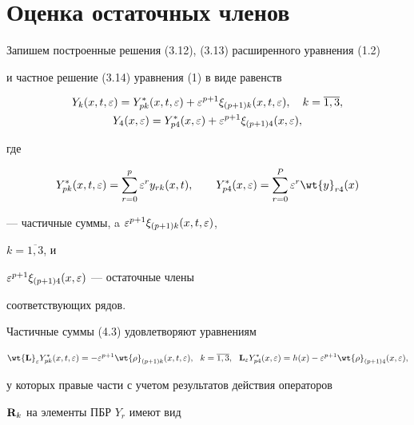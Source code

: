 \section{Оценка остаточных членов}





Запишем построенные решения (3.12), (3.13) расширенного уравнения (1.2)


и частное решение (3.14) уравнения (1) в виде равенств


\begin{gather}


Y_k (x, t, \e) = Y_{pk}^* (x, t, \e) + \e^{p+1}


\xi_{(p+1)k} (x, t, \e), \quad k =\overline{1,3},\\


Y_4 (x, \e ) = Y_{p4}^* (x, \e) + \e^{p+1} \xi_{(p+1)4} (x, \e),


\end{gather}


где


\begin{equation}


Y_{pk}^* (x, t, \e) = \sum \limits_{r=0} ^p \e^r y_{rk}(x, t),


\qquad Y_{p4}^* (x, \e) = \sum \limits_{r=0} ^P \e^r \wt{


y}_{r4}(x)


\end{equation}


--- частичные суммы, a $\varepsilon^{p+1} \xi_{(p+1)k} (x, t, \varepsilon)$,


$k = \overline{1,3}$, и


$\varepsilon^{p+1} \xi_{(p+1)4} (x, \varepsilon)$ --- остаточные члены


соответствующих рядов.





Частичные суммы (4.3) удовлетворяют уравнениям


$$


\wt{\bold L}_{\e} Y_{pk}^* (x, t, \e) = - \e^{p + 1} {\wt{\rho}}_{(p+1)k}


(x,t, \e),\ \ k = \overline{1,3}, \ \ \bold{{L}}_{\e} Y_{p 4}^* (x, \e)


= h(x) - \e^{p + 1} {\wt{\rho}}_{(p+1)4} (x, \e),


$$


у которых правые части с учетом результатов действия операторов


$\bold{R}_k$ на элементы ПБР $Y_r$ имеют вид


